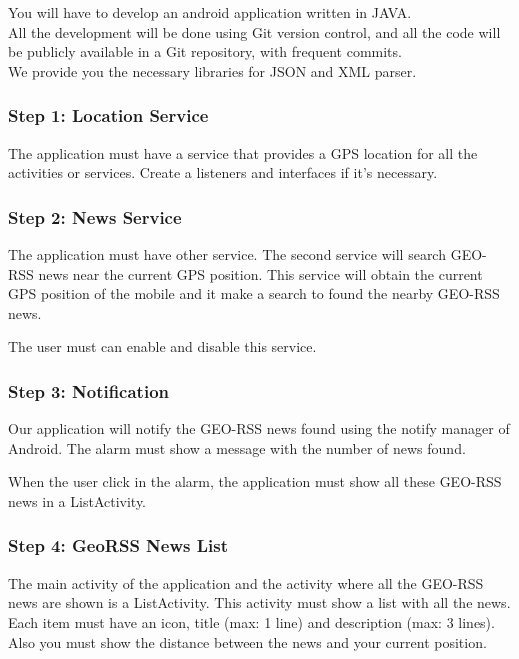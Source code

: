 \documentclass[a4paper]{article}
\begin{document}
You will have to develop an android application written in JAVA.
\\
All the development will be done using Git version control, and all
the code will be publicly available in a Git repository, with frequent
commits.
\\
We provide you the necessary libraries for JSON and XML parser.
\\
\subsubsection{Step 1: Location Service}

The application must have a service that provides a GPS location for
all the activities or services. Create a listeners and interfaces if
it's necessary. 

\subsubsection{Step 2: News Service}

The application must have other service. The second service will
search GEO-RSS news near the current GPS position. This service will
obtain the current GPS position of the mobile and it make a search to
found the nearby GEO-RSS news.

The user must can enable and disable this service.

\subsubsection{Step 3: Notification}

Our application will notify the GEO-RSS news found using the notify
manager of Android. The alarm must show a message with the number of
news found.

When the user click in the alarm, the application must show all these
GEO-RSS news in a ListActivity.

\subsubsection{Step 4: GeoRSS News List}

The main activity of the application and the activity where all the
GEO-RSS news are shown is a ListActivity. This activity must show a
list with all the news. Each item must have an icon, title (max: 1
line) and description (max: 3 lines). Also you must show the distance
between the news and your current position.
\end{document}
